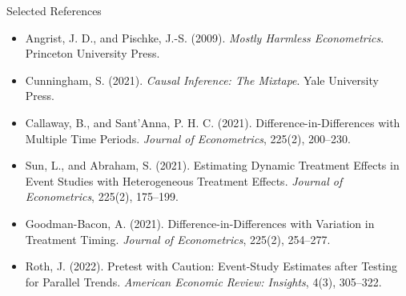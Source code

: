 \documentclass[aspectratio=169,11pt]{beamer}
\begin{document}
\begin{frame}{Selected References}
\small
\begin{itemize}
\item Angrist, J. D., and Pischke, J.-S. (2009). \textit{Mostly Harmless Econometrics}. Princeton University Press.
\item Cunningham, S. (2021). \textit{Causal Inference: The Mixtape}. Yale University Press.
\item Callaway, B., and Sant'Anna, P. H. C. (2021). Difference-in-Differences with Multiple Time Periods. \textit{Journal of Econometrics}, 225(2), 200--230.
\item Sun, L., and Abraham, S. (2021). Estimating Dynamic Treatment Effects in Event Studies with Heterogeneous Treatment Effects. \textit{Journal of Econometrics}, 225(2), 175--199.
\item Goodman-Bacon, A. (2021). Difference-in-Differences with Variation in Treatment Timing. \textit{Journal of Econometrics}, 225(2), 254--277.
\item Roth, J. (2022). Pretest with Caution: Event-Study Estimates after Testing for Parallel Trends. \textit{American Economic Review: Insights}, 4(3), 305--322.
\end{itemize}
\end{frame}

\contactslide
\end{document}
